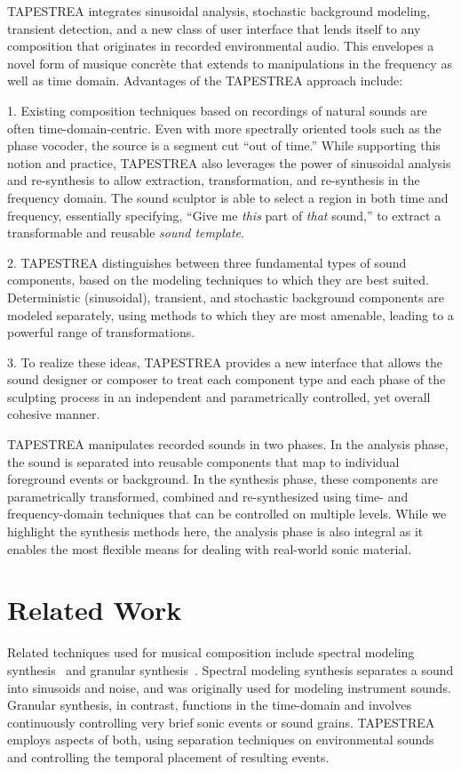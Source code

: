 \documentclass[10pt,letterpaper]{article}
\begin{document}
TAPESTREA integrates sinusoidal analysis, stochastic background modeling, transient detection, and a new class of user interface that lends itself to any composition that originates in recorded environmental audio. This envelopes a novel form of musique concr\`ete that extends to manipulations in the frequency as well as time domain. Advantages of the TAPESTREA approach include: 

1. Existing composition techniques based on recordings of natural sounds are often time-domain-centric. Even with more spectrally oriented tools such as the phase vocoder, the source is a segment cut ``out of time.'' While supporting this notion and practice, TAPESTREA also leverages the power of sinusoidal analysis and re-synthesis to allow extraction, transformation, and re-synthesis in the frequency domain. The sound sculptor is able to select a region in both time and frequency, essentially specifying, ``Give me \textit{this} part of \textit{that} sound,'' to extract a transformable and reusable \textit{sound template}.

2. TAPESTREA distinguishes between three fundamental types of sound components, based on the modeling techniques to which they are best suited. Deterministic (sinusoidal), transient, and stochastic background components are modeled separately, using methods to which they are most amenable, leading to a powerful range of transformations. 

3. To realize these ideas, TAPESTREA provides a new interface that allows the sound designer or composer to treat each component type and each phase of the sculpting process in an independent and parametrically controlled, yet overall cohesive manner. 

TAPESTREA manipulates recorded sounds in two phases. In the analysis
phase, the sound is separated into reusable components that map to
individual foreground events or background. In the synthesis phase,
these components are parametrically transformed, combined and
re-synthesized using time- and frequency-domain techniques that can be
controlled on multiple levels. While we highlight the synthesis methods
here, the analysis phase is also integral as it enables the
most flexible means for dealing with real-world sonic material.

\section{Related Work}

Related techniques used for musical composition include spectral modeling
synthesis~\cite{Serra89} and granular 
synthesis~\cite{Truax88,Truax90,Roads02}. Spectral modeling synthesis 
separates a sound into sinusoids and
noise, and was originally used for modeling instrument sounds. Granular
synthesis, in contrast, functions in the time-domain and involves
continuously controlling very brief sonic events or sound grains. TAPESTREA
employs aspects of both, using separation techniques on environmental sounds
and controlling the temporal placement of resulting events.
\end{document}
